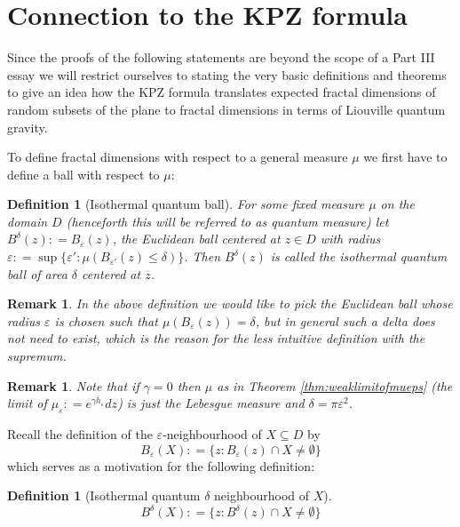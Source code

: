 \documentclass[11pt,reqno]{amsart}
\numberwithin{equation}{section}
\newtheorem{defi}[thm]{Definition}
\newtheorem{rem}[thm]{Remark}
\newcommand{\deq}{\mathrel{\mathop:}=}
\newcommand{\eps}{\varepsilon}
\begin{document}
\section{Connection to the KPZ formula}

Since the proofs of the following statements are beyond the scope of a Part III essay we will restrict ourselves to stating the very basic definitions and theorems to give an idea how the KPZ formula translates expected fractal dimensions of random subsets of the plane to fractal dimensions in terms of Liouville quantum gravity.

To define fractal dimensions with respect to a general measure $\mu$ we first have to define a ball with respect to $\mu$:
\begin{defi}[Isothermal quantum ball]
	For some fixed measure $\mu$ on the domain $D$ (henceforth this will be referred to as \emph{quantum measure}) let $B^\delta(z)\deq B_\eps(z)$, the Euclidean ball centered at $z\in D$ with radius $\eps\deq\sup\{\eps':\mu(B_{\eps'}(z)\leq\delta)\}$. Then $B^\delta(z)$ is called the \emph{isothermal quantum ball} of area $\delta$ centered at $z$.
\end{defi}
\begin{rem}
	In the above definition we would like to pick the Euclidean ball whose radius $\eps$ is chosen such that $\mu(B_\eps(z))=\delta$, but in general such a delta does not need to exist, which is the reason for the less intuitive definition with the supremum.
\end{rem}
\begin{rem}
	Note that if $\gamma=0$ then $\mu$ as in Theorem \ref{thm:weaklimitofmueps} (the limit of $\mu_\eps\deq e^{\gamma\overline h_\eps}dz$) is just the Lebesgue measure and $\delta=\pi\eps^2$.
\end{rem}
Recall the definition of the $\eps$-neighbourhood of $X\subseteq D$ by $$B_\eps(X)\deq \{z:B_\eps(z)\cap X\neq\emptyset \}$$ which serves as a motivation for the following definition:
\begin{defi}[Isothermal quantum $\delta$ neighbourhood of $X$]
	$$B^\delta(X)\deq \{z:B^\delta(z)\cap X\neq\emptyset\}$$
\end{defi}
\end{document}
